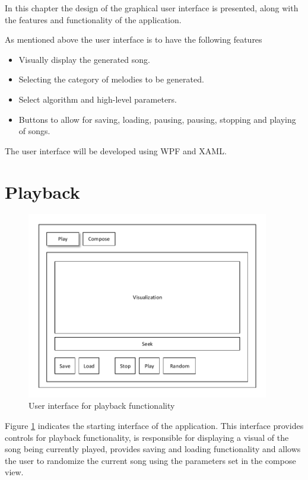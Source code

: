 In this chapter the design of the graphical user interface is presented, along with the features and functionality of the application.

As mentioned above the user interface is to have the following features
\begin{itemize}
\item Visually display the generated song.
\item Selecting the category of melodies to be generated.
\item Select algorithm and high-level parameters.
\item Buttons to allow for saving, loading, pausing, pausing, stopping and playing of songs.
\end{itemize}

The user interface will be developed using \ac{WPF} and \ac{XAML}.

\section{Playback}

\begin{figure}
\centerline{\includegraphics[width=400px]{../images/ui_play.pdf}}
\caption{User interface for playback functionality}
\label{ims:uiplay}
\end{figure}



Figure \ref{ims:uiplay} indicates the starting interface of the application. This interface provides controls for playback functionality, is responsible for displaying a visual of the song being currently played, provides saving and loading functionality and allows the user to randomize the current song using the parameters set in the compose view.


